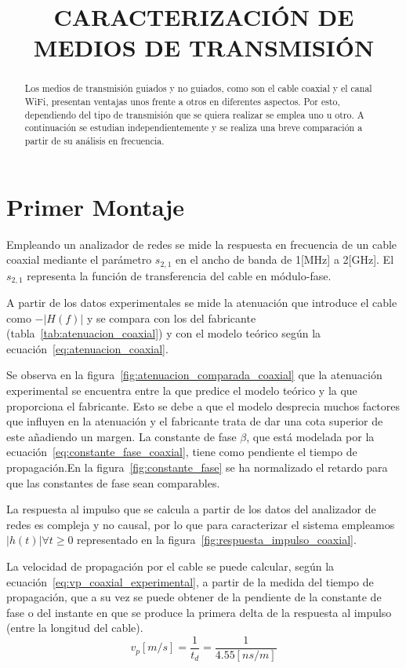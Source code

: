 \documentclass[10pt,conference,a4paper]{IEEEtran}
\title{CARACTERIZACIÓN DE MEDIOS DE TRANSMISIÓN}
\author{
    \IEEEauthorblockN{Pablo Arrieta Nata, Daniel Iñigo Baños.}
    \IEEEauthorblockA{uo194468@uniovi.es, uo194823@uniovi.es.}
    \IEEEauthorblockA{Grado en Tecnologias y Servicios de Telecomunicación. Universidad de Oviedo.}
    \IEEEauthorblockA{Sistemas de Telecomunicación. Curso 2013-14.}
}
\begin{document}
\maketitle

\begin{abstract}
    Los medios de transmisión guiados y no guiados, como son el cable coaxial y el canal WiFi, presentan ventajas unos frente a otros en diferentes aspectos. Por esto, dependiendo del tipo de transmisión que se quiera realizar se emplea uno u otro. A continuación se estudian independientemente y se realiza una breve comparación a partir de su análisis en frecuencia.
\end{abstract}

\section{Primer Montaje}
Empleando un analizador de redes se mide la respuesta en frecuencia de un cable coaxial mediante el parámetro $s_{2,1}$ en el ancho de banda de 1[MHz] a 2[GHz]. El $s_{2,1}$ representa la función de transferencia del cable en módulo-fase.

A partir de los datos experimentales se mide la atenuación que introduce el cable como $-|H(f)|$ y se compara con los del fabricante (tabla~\ref{tab:atenuacion_coaxial}) y con el modelo teórico según la ecuación~\ref{eq:atenuacion_coaxial}.

Se observa en la figura~\ref{fig:atenuacion_comparada_coaxial} que la atenuación experimental se encuentra entre la que predice el modelo teórico y la que proporciona el fabricante. Esto se debe a que el modelo desprecia muchos factores que influyen en la atenuación y el fabricante trata de dar una cota superior de este añadiendo un margen.
La constante de fase $\beta$, que está modelada por la ecuación~\ref{eq:constante_fase_coaxial}, tiene como pendiente el tiempo de propagación.En la figura~\ref{fig:constante_fase} se ha normalizado el retardo para que las constantes de fase sean comparables.

La respuesta al impulso que se calcula a partir de los datos del analizador de redes es compleja y no causal, por lo que para caracterizar el sistema empleamos $|h(t)| \forall t \geq 0$ representado en la figura~\ref{fig:respuesta_impulso_coaxial}.

La velocidad de propagación por el cable se puede calcular, según la ecuación~\ref{eq:vp_coaxial_experimental}, a partir de la medida del tiempo de propagación, que a su vez se puede obtener de la pendiente de la constante de fase o del instante en que se produce la primera delta de la respuesta al impulso (entre la longitud del cable).
\begin{equation}
    \label{eq:vp_coaxial_experimental}
    v_p [m/s] = \frac{1}{t_d} = \frac{1}{4.55 [ns/m]}
\end{equation}
\end{document}
